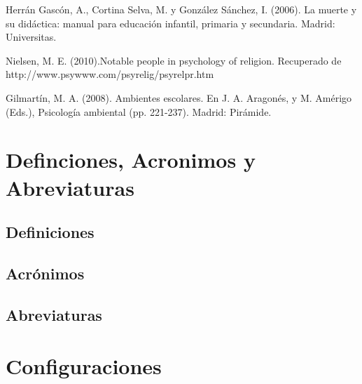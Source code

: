 \documentclass[letter,12pt]{report}
\begin{document}
\renewcommand{\refname}{Referencias}

%

\begin{thebibliography}{}
 Herrán Gascón, A., Cortina Selva, M. y González Sánchez, I. (2006). La muerte y su didáctica: manual para educación infantil, primaria y  secundaria. Madrid: Universitas.

 Nielsen, M. E. (2010).Notable people in psychology of religion. Recuperado 
de http://www.psywww.com/psyrelig/psyrelpr.htm

 Gilmartín, M. A. (2008). Ambientes escolares. En J. A. Aragonés, y M. Amérigo (Eds.), Psicología ambiental (pp. 221-237). Madrid: Pirámide.

\end{thebibliography}  














\renewcommand{\appendixname}{Anexos}
\appendix

\chapter{Definciones, Acronimos y Abreviaturas}\label{definiciones}
\section{Definiciones}
\section{Acrónimos}
\section{Abreviaturas}




\chapter{Configuraciones}\label{configuracion}
\blindtext %
\end{document}
